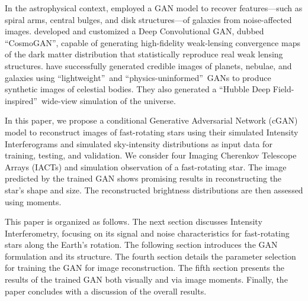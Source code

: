 In the astrophysical context, \cite{schawinski2017galaxypics} employed a GAN model to recover features—such as spiral arms, central bulges, and disk structures—of galaxies from noise-affected images. \cite{mustafa2019cosmogan} developed and customized a Deep Convolutional GAN, dubbed \textquotedblleft CosmoGAN\textquotedblright, capable of generating high-fidelity weak-lensing convergence maps of the dark matter distribution that statistically reproduce real weak lensing structures. \cite{coccomini2021lightweightgan} have successfully generated credible images of planets, nebulae, and galaxies using \textquotedblleft lightweight\textquotedblright\ and \textquotedblleft physics-uninformed\textquotedblright\ GANs to produce synthetic images of celestial bodies. They also generated a \textquotedblleft Hubble Deep Field-inspired\textquotedblright\ wide-view simulation of the universe. 

In this paper, we propose a conditional Generative Adversarial Network (cGAN) model \citep[following][]{isola2017image} to reconstruct images of fast-rotating stars using their simulated Intensity Interferograms and simulated sky-intensity distributions as input data for training, testing, and validation. We consider four Imaging Cherenkov Telescope Arrays (IACTs) and simulation observation of a fast-rotating star. The image predicted by the trained GAN shows promising results in reconstructing the star’s shape and size. The reconstructed brightness distributions are then assessed using moments.

This paper is organized as follows. The next section discusses Intensity Interferometry, focusing on its signal and noise characteristics for fast-rotating stars along the Earth’s rotation. The following section introduces the GAN formulation and its structure. The fourth section details the parameter selection for training the GAN for image reconstruction. The fifth section presents the results of the trained GAN both visually and via image moments. Finally, the paper concludes with a discussion of the overall results.
